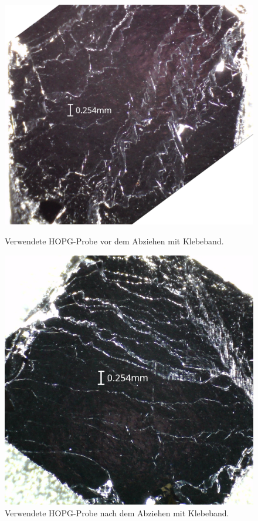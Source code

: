 \documentclass{article}
\begin{document}
\begin{figure}[h]
    \centering
    \begin{minipage}{0.52\textwidth}
        \centering
        \includegraphics[width=\textwidth]{HOPG_roh}
        \caption{Verwendete HOPG-Probe vor dem Abziehen mit Klebeband.}
        \label{fig:hopg-raw-lupe}
    \end{minipage}
    \hfill
    \begin{minipage}{0.46\textwidth}
        \centering
        \includegraphics[width=\textwidth]{HOPGnach}
        \caption{Verwendete HOPG-Probe nach dem Abziehen mit Klebeband.}
        \label{fig:hopg-nach-lupe}
    \end{minipage}
\end{figure}
\end{document}
